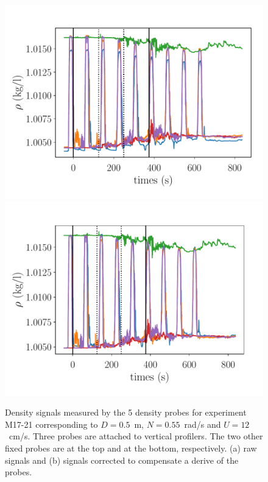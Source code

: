 \begin{figure}
\includegraphics[width=\figwidth]{tmp/fig_rho_vs_time}\\
\includegraphics[width=\figwidth]{tmp/fig_rho_vs_time_corrected}
\label{fig:rho:vs:time}

\caption{Density signals measured by the 5 density probes for experiment M17-21
corresponding to $D = 0.5$~m, $N=0.55$~rad/s and $U=12$~cm/s. Three probes are
attached to vertical profilers. The two other fixed probes are at the top and
at the bottom, respectively. (a) raw signals and (b) signals corrected to
compensate a derive of the probes.
}

\end{figure}

